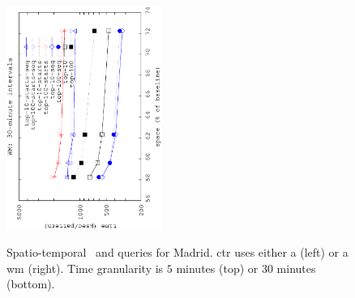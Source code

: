 \begin{figure}[!ht]
\begin{center}
			{\includegraphics[angle=-90,width=0.45\textwidth]{figures_synt/madrid_st_topk_wm_30.eps}}
			
		\end{center}
		\vspace{-0.3cm}
		\caption{Spatio-temporal {\Stk\ and \Stks} queries for Madrid. \acrshort{ctr} uses either a \glsacrlong (left) or a \acrlong{wm} (right). 
			Time granularity is $5$ minutes (top) or $30$ minutes (bottom). 
		}
		\label{fig:madridst.tk}

		\vspace{-0.2cm}
		\begin{center}


\end{center}
\end{figure}

